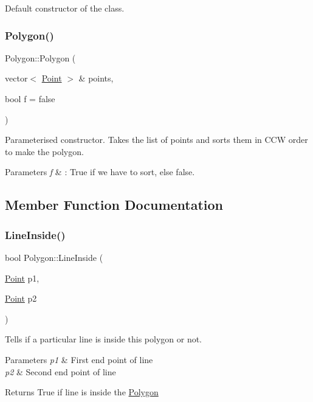 Default constructor of the class. \mbox{\label{classPolygon_a67e4b3859fad4adfcf277c79280df0df}} 
\subsubsection{\texorpdfstring{Polygon()}{Polygon()}\hspace{0.1cm}{\footnotesize\ttfamily [2/2]}}
{\footnotesize\ttfamily Polygon\+::\+Polygon (\begin{DoxyParamCaption}\item[{vector$<$ \hyperlink{classPoint}{Point} $>$ \&}]{points,  }\item[{bool}]{f = {\ttfamily false} }\end{DoxyParamCaption})}

Parameterised constructor. Takes the list of points and sorts them in C\+CW order to make the polygon. 
\begin{DoxyParams}{Parameters}
{\em f} & \+: True if we have to sort, else false. \\
\hline
\end{DoxyParams}


\subsection{Member Function Documentation}
\mbox{\label{classPolygon_acfe38a0974806e9706618d81b52ce8b7}} 
\subsubsection{\texorpdfstring{Line\+Inside()}{LineInside()}}
{\footnotesize\ttfamily bool Polygon\+::\+Line\+Inside (\begin{DoxyParamCaption}\item[{\hyperlink{classPoint}{Point}}]{p1,  }\item[{\hyperlink{classPoint}{Point}}]{p2 }\end{DoxyParamCaption})}

Tells if a particular line is inside this polygon or not. 
\begin{DoxyParams}{Parameters}
{\em p1} & First end point of line \\
\hline
{\em p2} & Second end point of line \\
\hline
\end{DoxyParams}
\begin{DoxyReturn}{Returns}
True if line is inside the \hyperlink{classPolygon}{Polygon} 
\end{DoxyReturn}
\mbox{\label{classPolygon_a034496e14ddd5516b3aed14c61d6fe02}} 
